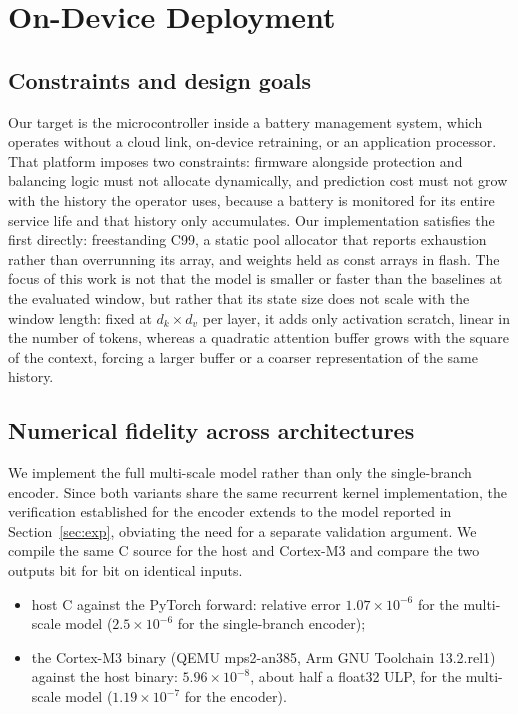 \documentclass[final,5p,times,twocolumn]{elsarticle}
\begin{document}
\section{On-Device Deployment}
\label{sec:deploy}


\subsection{Constraints and design goals}

Our target is the microcontroller inside a battery management system,
which operates without a cloud link, on-device retraining, or an
application processor. That platform imposes two constraints: firmware
alongside protection and balancing logic must not allocate dynamically,
and prediction cost must not grow with the history the operator uses,
because a battery is monitored for its entire service life and that
history only accumulates. Our implementation satisfies the first
directly: freestanding C99, a static pool allocator that reports
exhaustion rather than overrunning its array, and weights held as
const arrays in flash. The focus of this work is not that the model is smaller or faster 
than the baselines at the evaluated window, but rather that its state size does not scale with the window length: 
fixed at $d_k\times d_v$ per layer, it adds only activation scratch, linear in the number of tokens,
whereas a quadratic attention buffer grows with the square of the
context, forcing a larger buffer or a coarser representation of the same
history.

\subsection{Numerical fidelity across architectures}

We implement the full multi-scale model rather than only the single-branch encoder. 
Since both variants share the same recurrent kernel implementation, 
the verification established for the encoder extends to the model reported in Section~\ref{sec:exp},
obviating the need for a separate validation argument. 
We compile the same C source for the host and Cortex-M3 and compare the two outputs bit for bit on identical inputs.


\begin{itemize}
\item host C against the PyTorch forward: relative error
  $1.07\times10^{-6}$ for the multi-scale model
  ($2.5\times10^{-6}$ for the single-branch encoder);
\item the Cortex-M3 binary (QEMU mps2-an385, Arm GNU Toolchain
  13.2.rel1) against the host binary: $5.96\times10^{-8}$, about half a
  float32 ULP, for the multi-scale model ($1.19\times10^{-7}$ for the
  encoder).
\end{itemize}
\end{document}
